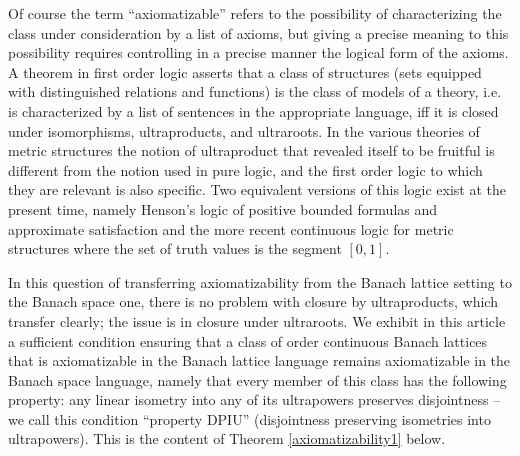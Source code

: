 \documentclass[11pt]{amsart}
\theoremstyle{plain}
\theoremstyle{remark}
\begin{document}
Of course the term ``axiomatizable'' refers to the possibility of characterizing the class under consideration by a list of axioms, but giving a precise meaning to this possibility requires controlling in a precise manner the logical form of the axioms. A theorem in first order logic asserts that a class of structures (sets equipped with distinguished relations and functions) is the class of models of a theory, i.e. is characterized by a list of sentences in the appropriate language,  iff it is closed under isomorphisms, ultraproducts, and ultraroots. In the various theories of metric structures the notion of ultraproduct that revealed itself to be fruitful is different from the notion used in pure logic, and the first order logic to which they are relevant is also specific. Two equivalent versions of this logic exist at the present time, namely Henson's logic of positive bounded formulas and approximate satisfaction \cite{HI} and the more recent continuous logic for metric structures \cite{BBHU} where the set of truth values is the segment $[0,1]$.

In this question of transferring axiomatizability from the Banach lattice setting to the Banach space one, there is no problem with closure by ultraproducts, which transfer clearly; the issue is in closure under ultraroots. We exhibit in this article a sufficient condition ensuring that a class of order continuous Banach lattices that is axiomatizable in the Banach lattice language remains axiomatizable in the Banach space language, namely that every member of this class has the following property: any linear isometry into any of its ultrapowers preserves disjointness -- we call this condition ``property DPIU'' (disjointness preserving isometries into ultrapowers). This is the  content of Theorem \ref{axiomatizability1} below.
\end{document}
